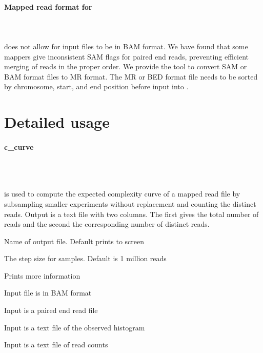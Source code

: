 \documentclass[11pt, titlepage]{article}
\begin{document}
\paragraph{Mapped read format for }~\\~\\[-.2cm]


 does not allow for input files to be in BAM format.
We have found that some mappers give inconsistent SAM flags
for paired end reads, preventing efficient merging of reads in 
the proper order.  
We provide the tool 
to convert SAM or BAM format files to MR format.  The MR
or BED format file needs to be sorted by chromosome, start, and
end position before input into .


\newpage

\section{Detailed usage}
\label{chap:detail}

\paragraph{c\_curve}~\\~\\[-.2cm]
\label{sec:complexityplot}

 is used to compute the 
expected complexity curve of a mapped read file by 
subsampling smaller experiments without replacement 
and counting the distinct reads.
Output is a text file with two 
columns.  The first gives the total number
of reads and the second the corresponding number
of distinct reads.

\begin{description}[style=multiline,leftmargin=6cm,font=\ttfamily]
\item[\begingroup \fontsize{9pt}{12pt}\selectfont-o, -output\endgroup] Name of output file. Default prints to screen
\item[\begingroup \fontsize{9pt}{12pt}\selectfont-s, -step\endgroup] The step size for samples. Default is 1 million reads
\item[\begingroup \fontsize{9pt}{12pt}\selectfont-v -verbose\endgroup] Prints more information
\item[\begingroup \fontsize{9pt}{12pt}\selectfont-B, -bam\endgroup] Input file is in BAM format
\item[\begingroup \fontsize{9pt}{12pt}\selectfont-P, -pe\endgroup] Input is a paired end read file
\item[\begingroup \fontsize{9pt}{12pt}\selectfont-H, -hist\endgroup] Input is a text file of the observed histogram
\item[\begingroup \fontsize{9pt}{12pt}\selectfont-V, -vals\endgroup] Input is a text file of read counts
\end{description}
\end{document}

